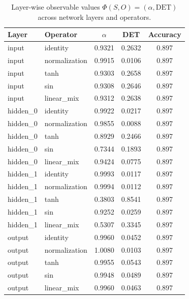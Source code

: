 \documentclass[11pt]{article}
\begin{document}
\begin{table}[h]
	\centering
	\caption{Layer-wise observable values $\Phi(S,O) = (\alpha, \mathrm{DET})$ across network layers and operators.}
	\begin{tabular}{l l c c c}
		\toprule
		Layer     & Operator      & $\alpha$ & DET    & Accuracy \\
		\midrule
		input     & identity      & 0.9321   & 0.2632 & 0.897    \\
		input     & normalization & 0.9915   & 0.0106 & 0.897    \\
		input     & tanh          & 0.9303   & 0.2658 & 0.897    \\
		input     & sin           & 0.9308   & 0.2646 & 0.897    \\
		input     & linear\_mix   & 0.9312   & 0.2638 & 0.897    \\
		hidden\_0 & identity      & 0.9922   & 0.0217 & 0.897    \\
		hidden\_0 & normalization & 0.9855   & 0.0088 & 0.897    \\
		hidden\_0 & tanh          & 0.8929   & 0.2466 & 0.897    \\
		hidden\_0 & sin           & 0.7344   & 0.1893 & 0.897    \\
		hidden\_0 & linear\_mix   & 0.9424   & 0.0775 & 0.897    \\
		hidden\_1 & identity      & 0.9993   & 0.0117 & 0.897    \\
		hidden\_1 & normalization & 0.9994   & 0.0112 & 0.897    \\
		hidden\_1 & tanh          & 0.3803   & 0.8541 & 0.897    \\
		hidden\_1 & sin           & 0.9252   & 0.0259 & 0.897    \\
		hidden\_1 & linear\_mix   & 0.5307   & 0.3345 & 0.897    \\
		output    & identity      & 0.9960   & 0.0452 & 0.897    \\
		output    & normalization & 1.0080   & 0.0103 & 0.897    \\
		output    & tanh          & 0.9955   & 0.0543 & 0.897    \\
		output    & sin           & 0.9948   & 0.0489 & 0.897    \\
		output    & linear\_mix   & 0.9960   & 0.0463 & 0.897    \\
		\bottomrule
	\end{tabular}
	\label{tab:layer_phi}
\end{table}
\end{document}
